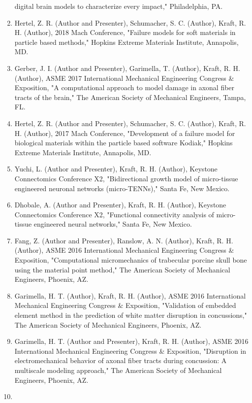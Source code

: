 \documentclass[
]{article}
\begin{document}
\begin{enumerate}
  digital brain models to characterize every impact," Philadelphia, PA.
\item
  Hertel, Z. R. (Author and Presenter), Schumacher, S. C. (Author),
  Kraft, R. H. (Author), 2018 Mach Conference, "Failure models for soft
  materials in particle based methods," Hopkins Extreme Materials
  Institute, Annapolis, MD.
\item
  Gerber, J. I. (Author and Presenter), Garimella, T. (Author), Kraft,
  R. H. (Author), ASME 2017 International Mechanical Engineering
  Congress \& Exposition, "A computational approach to model damage in
  axonal fiber tracts of the brain," The American Society of Mechanical
  Engineers, Tampa, FL.
\item
  Hertel, Z. R. (Author and Presenter), Schumacher, S. C. (Author),
  Kraft, R. H. (Author), 2017 Mach Conference, "Development of a failure
  model for biological materials within the particle based software
  Kodiak," Hopkins Extreme Materials Institute, Annapolis, MD.
\item
  Yuchi, L. (Author and Presenter), Kraft, R. H. (Author), Keystone
  Connectomics Conference X2, "Bidirectional growth model of
  micro-tissue engineered neuronal networks (micro-TENNs)," Santa Fe,
  New Mexico.
\item
  Dhobale, A. (Author and Presenter), Kraft, R. H. (Author), Keystone
  Connectomics Conference X2, "Functional connectivity analysis of
  micro-tissue engineered neural networks," Santa Fe, New Mexico.
\item
  Fang, Z. (Author and Presenter), Ranslow, A. N. (Author), Kraft, R. H.
  (Author), ASME 2016 International Mechanical Engineering Congress \&
  Exposition, "Computational micromechanics of trabecular porcine skull
  bone using the material point method," The American Society of
  Mechanical Engineers, Phoenix, AZ.
\item
  Garimella, H. T. (Author), Kraft, R. H. (Author), ASME 2016
  International Mechanical Engineering Congress \& Exposition,
  "Validation of embedded element method in the prediction of white
  matter disruption in concussions," The American Society of Mechanical
  Engineers, Phoenix, AZ.
\item
  Garimella, H. T. (Author and Presenter), Kraft, R. H. (Author), ASME
  2016 International Mechanical Engineering Congress \& Exposition,
  "Disruption in electromechanical behavior of axonal fiber tracts
  during concussion: A multiscale modeling approach," The American
  Society of Mechanical Engineers, Phoenix, AZ.
\item

\end{enumerate}
\end{document}
